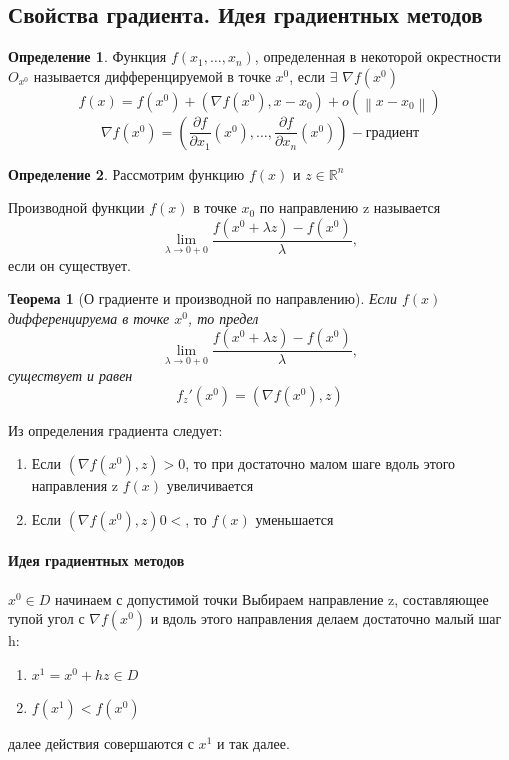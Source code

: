 \documentclass[a4paper]{article}
\newtheorem{theorem}{Теорема}[section]
\theoremstyle{definition}
\newtheorem*{definition}{Определение}
\theoremstyle{remark}
\begin{document}
\subsection{Свойства градиента. Идея градиентных методов}
\begin{definition}
    Функция $f(x_1, \dots, x_n)$, определенная в некоторой окрестности
    $O_{x^0}$ называется дифференцируемой в точке $x^0$,
    если $\exists$ $\nabla f(x^0)$
    \[f(x) = f(x^0) + (\nabla f(x^0), x-x_0)+ o (\left\lVert x-x_0\right\rVert )\]
    \[\nabla f(x^0) = (\frac{\partial f}{\partial x_1}(x^0), \dots, \frac{\partial f}{\partial x_n}(x^0)) - \textbf{градиент}\]

\end{definition}
\begin{definition}
    Рассмотрим функцию $f(x)$ и $z\in \mathbb{R}^n$

    Производной функции $f(x)$ в точке $x_0$ по направлению z называется 
    \[\lim_{\lambda \to 0+0} \frac{f(x^0+\lambda z) - f(x^0)}{\lambda},\]
    если он существует.
\end{definition}
\begin{theorem}[О градиенте и производной по направлению]
    Если $f(x)$ дифференцируема в точке $x^0$, то 
    предел 
    \[\lim_{\lambda \to 0+0} \frac{f(x^0+\lambda z) - f(x^0)}{\lambda},\] существует и равен
    \[f_z'(x^0) = (\nabla f(x^0), z)\]
\end{theorem}
Из определения градиента следует:
\begin{enumerate}
    \item Если $(\nabla f(x^0), z)>0$, то при достаточно малом шаге вдоль этого направления z $f(x)$ увеличивается
    \item Если $(\nabla f(x^0), z)0<$, то $f(x)$ уменьшается
\end{enumerate}
\paragraph*{Идея градиентных методов}
    $x^0\in D$ начинаем с допустимой точки
    Выбираем направление z, составляющее тупой угол с $\nabla f(x^0)$ и вдоль этого направления делаем достаточно малый шаг h:
    \begin{enumerate}
        \item $x^1 = x^0 + hz\in D$
        \item $f(x^1)< f(x^0)$
    \end{enumerate}
    далее действия совершаются с $x^1$ и так далее.
\end{document}
